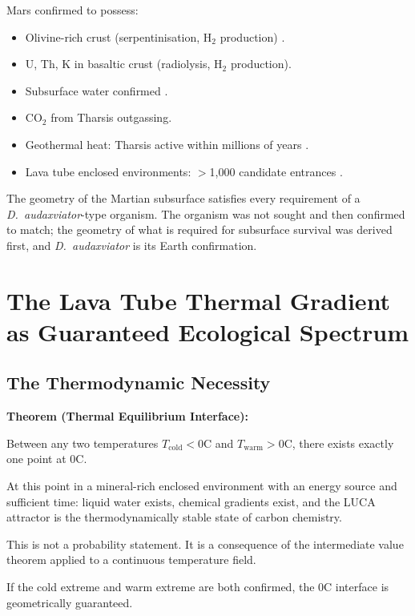 \documentclass[11pt, a4paper]{article}
\begin{document}
Mars confirmed to possess:
\begin{itemize}[leftmargin=*]
\item Olivine-rich crust (serpentinisation,
  H$_2$ production) \cite{ehlmann2010}.
\item U, Th, K in basaltic crust
  (radiolysis, H$_2$ production).
\item Subsurface water confirmed \cite{orosei2018}.
\item CO$_2$ from Tharsis outgassing.
\item Geothermal heat: Tharsis active
  within millions of years \cite{tharsis2023}.
\item Lava tube enclosed environments:
  $>$1,000 candidate entrances \cite{mgc3catalog}.
\end{itemize}

The geometry of the Martian subsurface
satisfies every requirement of a
\textit{D.\ audaxviator}-type organism.
The organism was not sought and then
confirmed to match; the geometry of what
is required for subsurface survival was
derived first, and \textit{D.\ audaxviator}
is its Earth confirmation.

\section{The Lava Tube Thermal Gradient
as Guaranteed Ecological Spectrum}

\subsection{The Thermodynamic Necessity}

\begin{mdframed}[
  linecolor=rulecolor,
  linewidth=0.8pt,
  innertopmargin=0.5em,
  innerbottommargin=0.5em,
  innerleftmargin=1em,
  innerrightmargin=1em
]
\textbf{Theorem (Thermal Equilibrium Interface):}

Between any two temperatures $T_{\text{cold}} < 0$\textdegree{}C
and $T_{\text{warm}} > 0$\textdegree{}C,
there exists exactly one point at 0\textdegree{}C.

At this point in a mineral-rich enclosed
environment with an energy source and
sufficient time: liquid water exists,
chemical gradients exist, and the LUCA
attractor is the thermodynamically stable
state of carbon chemistry.

This is not a probability statement.
It is a consequence of the intermediate
value theorem applied to a continuous
temperature field.

If the cold extreme and warm extreme
are both confirmed, the 0\textdegree{}C
interface is geometrically guaranteed.
\end{mdframed}
\end{document}
